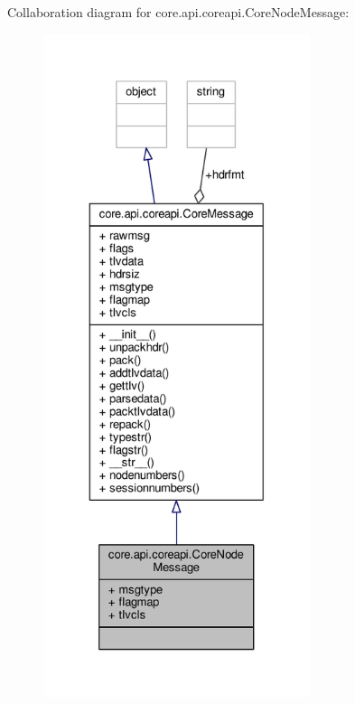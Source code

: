 Collaboration diagram for core.\+api.\+coreapi.\+Core\+Node\+Message\+:
\nopagebreak
\begin{figure}[H]
\begin{center}
\leavevmode
\includegraphics[height=550pt]{classcore_1_1api_1_1coreapi_1_1_core_node_message__coll__graph}
\end{center}
\end{figure}
